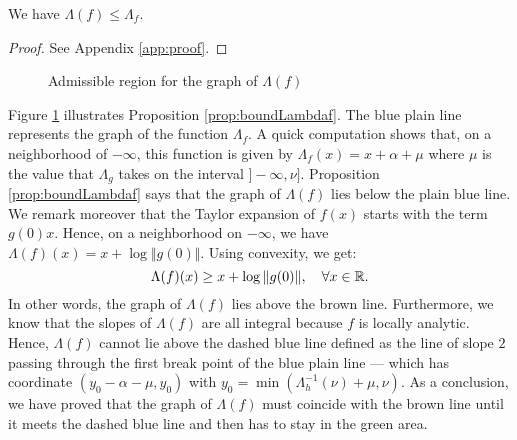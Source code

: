 \documentclass{sig-alternate}
\begin{document}
\begin{prop}
\label{prop:boundLambdaf}\label{PROP:BOUNDLAMBDAF}
We have $\Lambda(f) \leq \Lambda_f$.
\end{prop}

\begin{proof}
See Appendix \ref{app:proof}.
\end{proof}

\begin{figure}
\null \hfill
{}
\hfill \null

\caption{Admissible region for the graph of $\Lambda(f)$}
\label{fig:area}
\end{figure}

Figure \ref{fig:area} illustrates Proposition \ref{prop:boundLambdaf}. 
The blue plain line represents the graph of the function $\Lambda_f$. A 
quick computation shows that, on a neighborhood of ${-}\infty$, this 
function is given by $\Lambda_f(x) = x + \alpha + \mu$
where $\mu$ is the value that $\Lambda_g$ takes on the interval 
$]{-}\infty, \nu]$. Proposition \ref{prop:boundLambdaf} says that the
graph of $\Lambda(f)$ lies below the plain blue line. We remark
moreover that the Taylor expansion of $f(x)$ starts with the term
$g(0) x$. Hence, on a neighborhood on ${-}\infty$, we have 
$\Lambda(f)(x) = x + \log \Vert g(0) \Vert$. Using convexity, we 
get:
$$\Lambda(f)(x) \geq x + \log \Vert g(0) \Vert, 
  \quad \forall x \in \mathbb R.$$
In other words, the graph of $\Lambda(f)$ lies above the brown line.
Furthermore, we know that the slopes of $\Lambda(f)$ are all integral
because $f$ is locally analytic. Hence, $\Lambda(f)$ cannot lie above
the dashed blue line defined as the line of slope $2$ passing through
the first break point of the blue plain line --- which has coordinate 
$(y_0 - \alpha - \mu, y_0)$ with $y_0 = \min(\Lambda_h^{-1}(\nu) + \mu, 
\nu)$. As a conclusion, we have proved that the graph of $\Lambda(f)$ 
must coincide with the brown line until it meets the dashed blue line 
and then has to stay in the green area.
\end{document}
